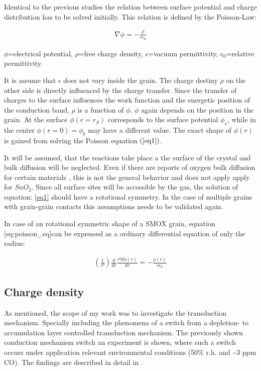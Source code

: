 \documentclass[11pt]{article}
\begin{document}
Identical to the previous studies the relation between surface potential
and charge distribution has to be solved initially. This relation is
defined by the Poisson-Law:

\begin{align}
\nabla\phi=-\frac{\rho}{\epsilon\epsilon_{0}} \label{eq1}\tag{Poisson}
\end{align}

\(\phi\)=electrical potential, \(\rho\)=free charge density,
\(\epsilon\)=vacuum permittivity, \(\epsilon_{0}\)=relative
permittivity.

It is assume that \(\epsilon\) does not vary inside the grain. The
charge destiny \(\rho\) on the other side is directly influenced by the
charge transfer. Since the transfer of charges to the surface influences
the work function and the energetic position of the conduction band,
\(\rho\) is a function of \(\phi\). \(\phi\) again depends on the
position in the grain. At the surface \(\phi(r=r_{S})\) corresponds to
the surface potential \(\phi_s\), while in the center
\(\phi(r=0)=\phi_b\) may have a different value. The exact shape of
\(\phi(r)\) is gained from solving the Poisson equation \((\ref{eq1})\).

It will be assumed, that the reactions take place a the surface of the
crystal and bulk diffusion will be neglected. Even if there are reports
of oxygen bulk diffusion for certain materials , this is not the general
behavior and does not apply apply for \(SnO_{2}\). Since all surface
sites will be accessible by the gas, the solution of equation: \ref{eq1}
should have a rotational symmetry. In the case of multiple grains with
grain-grain contacts this assumptions needs to be validated again.

In case of an rotational symmetric shape of a SMOX grain, equation
{[}eq:poisson\_eq{]}can be expressed as a ordinary differential equation
of only the radius:

\begin{align}
(\frac{1}{r²})\frac{d}{dr}\frac{r²d\phi(r)}{dr}=-\frac{\rho(r)}{\epsilon\epsilon_{0}}\label{poisson_spherical_1}\tag{Poisson spherical 1}
\end{align}

\hypertarget{charge-density}{%
\subsection{Charge density}\label{charge-density}}

As mentioned, the scope of my work was to investigate the transduction
mechanism. Specially including the phenomena of a switch from a
depletion- to accumulation layer controlled transduction mechanism. The
previously shown conduction mechanism switch an experiment is shown,
where such a switch occurs under application relevant environmental
conditions (50\% r.h. and \textasciitilde3 ppm CO). The findings are
described in detail in \cite{Barsan2015}.
\end{document}
